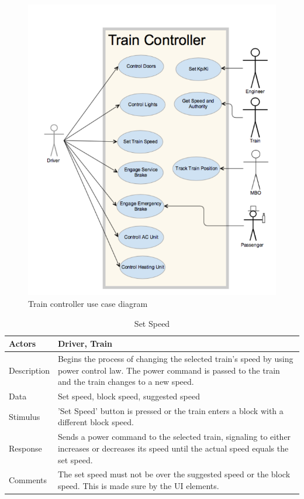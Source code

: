 \documentclass[]{article}
\begin{document}
\begin{figure}[H]
	\centering
	\includegraphics[scale=.2]{traincontrollerusecase.png}
	\caption{Train controller use case diagram}
\end{figure}

   \begin{table}[H]
   	\centering
   	\caption{Set Speed}
   	\begin{tabular}{|l|l|}
   		\hline
   		Actors & \parbox[t]{10cm}{Driver, Train} \\ \hline
   		Description & \parbox[t]{10cm}{Begins the process of changing the selected train's speed by using power control law. The power command is passed to the train and the train changes to a new speed.} \\ \hline
   		Data &  \parbox[t]{10cm}{Set speed, block speed, suggested speed} \\ \hline
   		Stimulus &  \parbox[t]{10cm}{'Set Speed' button is pressed or the train enters a block with a different block speed. } \\ \hline
   		Response & \parbox[t]{10cm}{Sends a power command to the selected train, signaling to either increases or decreases its speed until the actual speed equals the set speed.  }\\ \hline
   		Comments & \parbox[t]{10cm}{The set speed must not be over the suggested speed or the block speed. This is made sure by the UI elements. }  \\ \hline
   	\end{tabular}
   \end{table}
   
\end{document}
